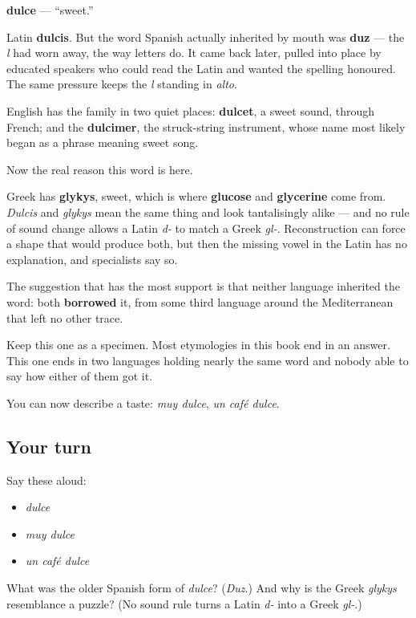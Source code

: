 \begin{cousinweb}
\textbf{dulce} — \textquotedblleft{}sweet.\textquotedblright{}

Latin \textbf{dulcis}. But the word Spanish actually inherited by mouth was \textbf{duz} — the \emph{l} had worn away, the way letters do. It came back later, pulled into place by educated speakers who could read the Latin and wanted the spelling honoured. The same pressure keeps the \emph{l} standing in \emph{alto}.

English has the family in two quiet places: \textbf{dulcet}, a sweet sound, through French; and the \textbf{dulcimer}, the struck-string instrument, whose name most likely began as a phrase meaning sweet song.

Now the real reason this word is here.

Greek has \textbf{glykys}, sweet, which is where \textbf{glucose} and \textbf{glycerine} come from. \emph{Dulcis} and \emph{glykys} mean the same thing and look tantalisingly alike — and no rule of sound change allows a Latin \emph{d-} to match a Greek \emph{gl-}. Reconstruction can force a shape that would produce both, but then the missing vowel in the Latin has no explanation, and specialists say so.

The suggestion that has the most support is that neither language inherited the word: both \textbf{borrowed} it, from some third language around the Mediterranean that left no other trace.

Keep this one as a specimen. Most etymologies in this book end in an answer. This one ends in two languages holding nearly the same word and nobody able to say how either of them got it.
\end{cousinweb}

\begin{grammarlens}[title={What you've built}]
You can now describe a taste: \emph{muy dulce}, \emph{un café dulce}.
\end{grammarlens}

\subsection*{Your turn}
Say these aloud:

\begin{itemize}
\raggedright
  \item \emph{dulce}
  \item \emph{muy dulce}
  \item \emph{un café dulce}
\end{itemize}

\begin{tcolorbox}[breakable,colback=teal!4,colframe=teal!35!black,title={Before you move on}]
What was the older Spanish form of \emph{dulce}? (\emph{Duz}.) And why is the Greek \emph{glykys} resemblance a puzzle? (No sound rule turns a Latin \emph{d-} into a Greek \emph{gl-}.)
\end{tcolorbox}
